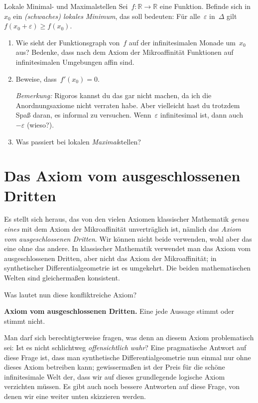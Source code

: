 \documentclass[twoside]{../zirkelblatt}
\newcommand{\RR}{\mathbb{R}}
\theoremstyle{definition}
\theoremstyle{plain}
\theoremstyle{remark}
\begin{document}
\begin{aufgabeShaded}{Lokale Minimal- und Maximalstellen}
Sei~$f : \RR \to \RR$ eine Funktion. Befinde sich in~$x_0$ ein
\emph{(schwaches) lokales Minimum}, das soll bedeuten: Für alle~$\varepsilon$
in~$\Delta$ gilt~$f(x_0 + \varepsilon) \geq f(x_0)$.

\begin{enumerate}
\item Wie sieht der Funktionsgraph von~$f$ auf der infinitesimalen Monade
um~$x_0$ aus? Bedenke, dass nach dem Axiom der Mikroaffinität Funktionen auf
infinitesimalen Umgebungen affin sind.
\item Beweise, dass~$f'(x_0) = 0$.

\emph{Bemerkung:} Rigoros kannst du das gar nicht machen, da ich die
Anordnungsaxiome nicht verraten habe. Aber vielleicht hast du trotzdem Spaß
daran, es informal zu versuchen. Wenn~$\varepsilon$ infinitesimal ist, dann
auch~$-\varepsilon$ (wieso?).
\item Was passiert bei lokalen \emph{Maximal}stellen?
\end{enumerate}
\end{aufgabeShaded}


\section{Das Axiom vom ausgeschlossenen Dritten}
\label{sect:lem}

Es stellt sich heraus, das von den vielen Axiomen klassischer Mathematik
\emph{genau eines} mit dem Axiom der Mikroaffinität unverträglich ist, nämlich
das \emph{Axiom vom ausgeschlossenen Dritten}. Wir können nicht beide
verwenden, wohl aber das eine ohne das andere. In klassischer Mathematik
verwendet man das Axiom vom ausgeschlossenen Dritten, aber nicht das Axiom der
Mikroaffinität; in synthetischer Differentialgeometrie ist es umgekehrt. Die
beiden mathematischen Welten sind gleichermaßen konsistent.

Was lautet nun diese konfliktreiche Axiom?

\begin{shaded}
\textbf{Axiom vom ausgeschlossenen Dritten.} Eine jede Aussage stimmt oder
stimmt nicht.
\end{shaded}

Man darf sich berechtigterweise fragen, was denn an diesem Axiom problematisch
sei: Ist es nicht schlichtweg \emph{offensichtlich wahr}? Eine pragmatische
Antwort auf diese Frage ist, dass man synthetische Differentialgeometrie nun einmal
nur ohne dieses Axiom betreiben kann; gewissermaßen ist der Preis für die
schöne infinitesimale Welt der, dass wir auf dieses grundlegende logische Axiom
verzichten müssen. Es gibt auch noch bessere Antworten auf diese Frage, von
denen wir eine weiter unten skizzieren werden.
\end{document}
